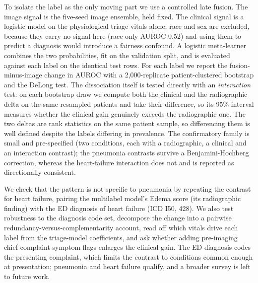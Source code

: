 \documentclass[twocolumn, final]{svjour3}
\begin{document}
To isolate the label as the only moving part we use a controlled late fusion. The image
signal is the five-seed image ensemble, held fixed. The clinical signal is a logistic model
on the physiological triage vitals alone; race and sex are excluded, because they carry no
signal here (race-only AUROC 0.52) and using them to predict a diagnosis would introduce a
fairness confound. A logistic meta-learner combines the two probabilities, fit on the
validation split, and is evaluated against each label on the identical test rows. For each
label we report the fusion-minus-image change in AUROC with a 2{,}000-replicate
patient-clustered bootstrap and the DeLong test. The dissociation itself is tested directly
with an \emph{interaction} test: on each bootstrap draw we compute both the clinical and the
radiographic delta on the same resampled patients and take their difference, so its 95\%
interval measures whether the clinical gain genuinely exceeds the radiographic one. The two
deltas are rank statistics on the same patient sample, so differencing them is well defined
despite the labels differing in prevalence. The confirmatory family is small and
pre-specified (two conditions, each with a radiographic, a clinical and an interaction
contrast); the pneumonia contrasts survive a Benjamini-Hochberg correction, whereas the
heart-failure interaction does not and is reported as directionally consistent.

We check that the pattern is not specific to pneumonia by repeating the contrast for heart
failure, pairing the multilabel model's Edema score (its radiographic finding) with the ED
diagnosis of heart failure (ICD I50, 428). We also test robustness to the diagnosis code
set, decompose the change into a pairwise redundancy-versus-complementarity account, read
off which vitals drive each label from the triage-model coefficients, and ask whether adding
pre-imaging chief-complaint symptom flags enlarges the clinical gain. The ED diagnosis codes
the presenting complaint, which limits the contrast to conditions common enough at
presentation; pneumonia and heart failure qualify, and a broader survey is left to future
work.
\end{document}

